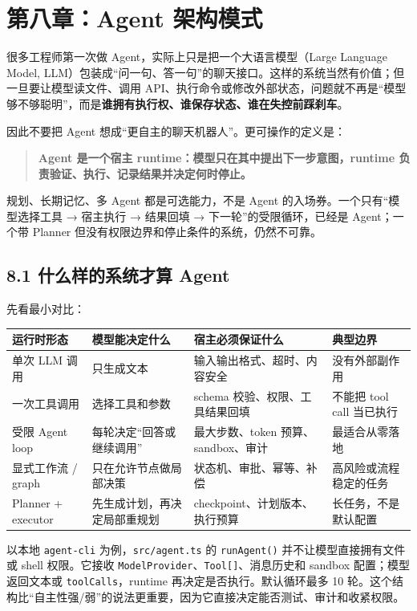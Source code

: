 \chapter{第八章：Agent 架构模式}

很多工程师第一次做 Agent，实际上只是把一个大语言模型（Large Language Model, LLM）包装成``问一句、答一句''的聊天接口。这样的系统当然有价值；但一旦要让模型读文件、调用 API、执行命令或修改外部状态，问题就不再是``模型够不够聪明''，而是\textbf{谁拥有执行权、谁保存状态、谁在失控前踩刹车}。

因此不要把 Agent 想成``更自主的聊天机器人''。更可操作的定义是：

\begin{quote}
\textbf{Agent 是一个宿主 runtime：模型只在其中提出下一步意图，runtime 负责验证、执行、记录结果并决定何时停止。}
\end{quote}

规划、长期记忆、多 Agent 都是可选能力，不是 Agent 的入场券。一个只有``模型选择工具 → 宿主执行 → 结果回填 → 下一轮''的受限循环，已经是 Agent；一个带 Planner 但没有权限边界和停止条件的系统，仍然不可靠。


\section{8.1 什么样的系统才算 Agent}

先看最小对比：


\begingroup
\scriptsize
\setlength{\tabcolsep}{3pt}
\begin{longtable}{|p{}|p{}|p{}|p{}|}
\hline
运行时形态 & 模型能决定什么 & 宿主必须保证什么 & 典型边界 \\ \hline
单次 LLM 调用 & 只生成文本 & 输入输出格式、超时、内容安全 & 没有外部副作用 \\ \hline
一次工具调用 & 选择工具和参数 & schema 校验、权限、工具结果回填 & 不能把 tool call 当已执行 \\ \hline
受限 Agent loop & 每轮决定“回答或继续调用” & 最大步数、token 预算、sandbox、审计 & 最适合从零落地 \\ \hline
显式工作流 / graph & 只在允许节点做局部决策 & 状态机、审批、幂等、补偿 & 高风险或流程稳定的任务 \\ \hline
Planner + executor & 先生成计划，再决定局部重规划 & checkpoint、计划版本、执行预算 & 长任务，不是默认配置 \\ \hline
\end{longtable}
\endgroup

以本地 \texttt{agent-cli} 为例，\texttt{src/agent.ts} 的 \texttt{runAgent()} 并不让模型直接拥有文件或 shell 权限。它接收 \texttt{ModelProvider}、\texttt{Tool[]}、消息历史和 sandbox 配置；模型返回文本或 \texttt{toolCalls}，runtime 再决定是否执行。默认循环最多 10 轮。这个结构比``自主性强/弱''的说法更重要，因为它直接决定能否测试、审计和收紧权限。

